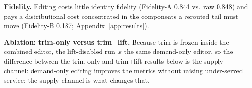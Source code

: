
\textbf{Fidelity.} Editing costs little identity fidelity (Fidelity-A 0.844
vs.\ raw 0.848) and pays a distributional cost concentrated in the components
a rerouted tail must move (Fidelity-B 0.187; Appendix~\ref{app:results}).

\textbf{Ablation: trim-only versus trim+lift.}
Because trim is frozen inside the combined editor, the lift-disabled run is
the same demand-only editor, so the difference between the trim-only and
trim+lift results below is the supply channel: demand-only editing improves the metrics without raising
under-served service; the supply channel is what changes that.

